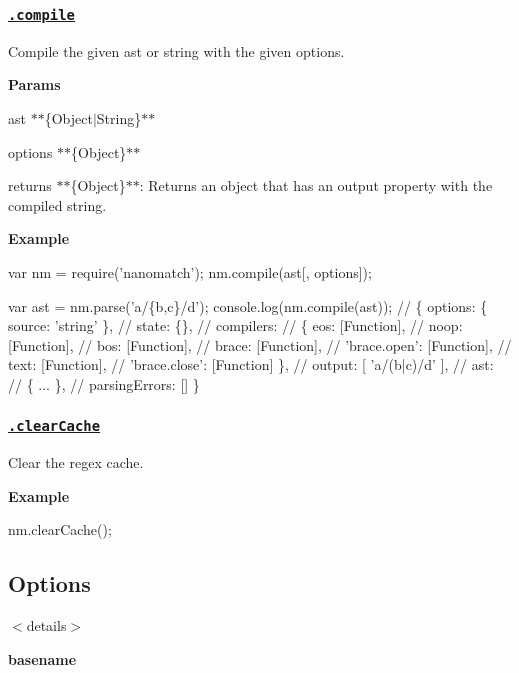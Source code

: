 \subsubsection*{\href{index.js#L745}{\tt .compile}}

Compile the given {\ttfamily ast} or string with the given {\ttfamily options}.

{\bfseries Params}


\begin{DoxyItemize}
\item {\ttfamily ast} $\ast$$\ast$\{Object$\vert$\+String\}$\ast$$\ast$
\item {\ttfamily options} $\ast$$\ast$\{Object\}$\ast$$\ast$
\item {\ttfamily returns} $\ast$$\ast$\{Object\}$\ast$$\ast$\+: Returns an object that has an {\ttfamily output} property with the compiled string.
\end{DoxyItemize}

{\bfseries Example}


\begin{DoxyCode}
var nm = require('nanomatch');
nm.compile(ast[, options]);

var ast = nm.parse('a/\{b,c\}/d');
console.log(nm.compile(ast));
// \{ options: \{ source: 'string' \},
//   state: \{\},
//   compilers:
//    \{ eos: [Function],
//      noop: [Function],
//      bos: [Function],
//      brace: [Function],
//      'brace.open': [Function],
//      text: [Function],
//      'brace.close': [Function] \},
//   output: [ 'a/(b|c)/d' ],
//   ast:
//    \{ ... \},
//   parsingErrors: [] \}
\end{DoxyCode}


\subsubsection*{\href{index.js#L768}{\tt .clear\+Cache}}

Clear the regex cache.

{\bfseries Example}


\begin{DoxyCode}
nm.clearCache();
\end{DoxyCode}


\subsection*{Options}

$<$details$>$ 

{\bfseries basename}

